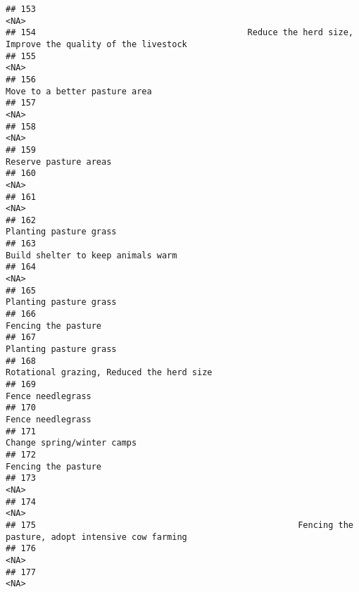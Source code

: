 \documentclass[
]{article}
\begin{document}
\begin{verbatim}
## 153                                                                                                <NA>
## 154                                          Reduce the herd size, Improve the quality of the livestock
## 155                                                                                                <NA>
## 156                                                                       Move to a better pasture area
## 157                                                                                                <NA>
## 158                                                                                                <NA>
## 159                                                                               Reserve pasture areas
## 160                                                                                                <NA>
## 161                                                                                                <NA>
## 162                                                                              Planting pasture grass
## 163                                                                  Build shelter to keep animals warm
## 164                                                                                                <NA>
## 165                                                                              Planting pasture grass
## 166                                                                                 Fencing the pasture
## 167                                                                              Planting pasture grass
## 168                                                           Rotational grazing, Reduced the herd size
## 169                                                                                   Fence needlegrass
## 170                                                                                   Fence needlegrass
## 171                                                                          Change spring/winter camps
## 172                                                                                 Fencing the pasture
## 173                                                                                                <NA>
## 174                                                                                                <NA>
## 175                                                    Fencing the pasture, adopt intensive cow farming
## 176                                                                                                <NA>
## 177                                                                                                <NA>

\end{verbatim}
\end{document}
